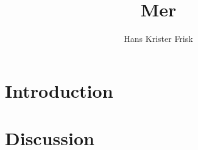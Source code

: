 \documentclass[11pt,a4paper]{article}
\begin{document}
    \title{Mer}
\author{Hans Krister Frisk}
\maketitle

\begin{abstract}

\end{abstract}

\tableofcontents

\section{Introduction}



\section{Discussion}

\begin{thebibliography}{99}

\end{thebibliography}
\end{document}
